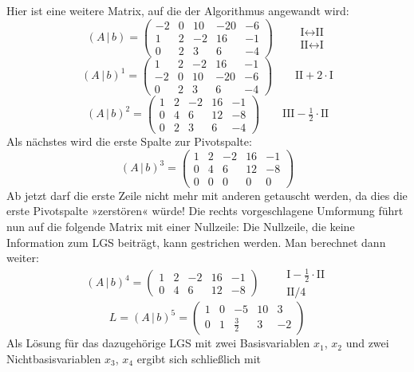 Hier ist eine weitere Matrix, auf die der Algorithmus angewandt wird:
\[ (A\,|\,b) = \left(\begin{array}{cccc|c} -2 & 0 & 10 & -20 & -6\\ 1 & 2 & -2 & 16 & -1\\ 0 & 2 & 3 & 6 & -4 \end{array}\right) \qquad \begin{array}{l} \text{I}\leftrightarrow\text{II}\\ \text{II}\leftrightarrow\text{I} \end{array} \]
\[ (A\,|\,b)^1 = \left(\begin{array}{cccc|c} 1 & 2 & -2 & 16 & -1\\ -2 & 0 & 10 & -20 & -6\\ 0 & 2 & 3 & 6 & -4 \end{array}\right) \qquad \text{II}+2\cdot\text{I} \]
\[ (A\,|\,b)^2 = \left(\begin{array}{cccc|c} 1 & 2 & -2 & 16 & -1\\ 0 & 4 & 6 & 12 & -8\\ 0 & 2 & 3 & 6 & -4 \end{array}\right) \qquad \text{III}-\tfrac{1}{2}\cdot\text{II} \]
Als nächstes wird die erste Spalte zur Pivotspalte:
\[ (A\,|\,b)^3 = \left(\begin{array}{cccc|c} 1 & 2 & -2 & 16 & -1\\ 0 & 4 & 6 & 12 & -8\\ 0 & 0 & 0 & 0 & 0 \end{array}\right) \]
Ab jetzt darf die erste Zeile nicht mehr mit anderen getauscht werden, da dies die erste Pivotspalte »zerstören« würde!
Die rechts vorgeschlagene Umformung führt nun auf die folgende Matrix mit einer Nullzeile:
Die Nullzeile, die keine Information zum LGS beiträgt, kann gestrichen werden. Man berechnet dann weiter:
\[ (A\,|\,b)^4 = \left(\begin{array}{cccc|c} 1 & 2 & -2 & 16 & -1\\ 0 & 4 & 6 & 12 & -8 \end{array}\right) \qquad \begin{array}{l} \text{I}-\tfrac{1}{2}\cdot\text{II}\\ \text{II}/4 \end{array} \]
\[ L = (A\,|\,b)^5 = \left(\begin{array}{cccc|c} 1 & 0 & -5 & 10 & 3\\ 0 & 1 & \frac{3}{2} & 3 & -2 \end{array}\right) \]
Als Lösung für das dazugehörige LGS mit zwei Basisvariablen $x_1$, $x_2$ und zwei Nichtbasisvariablen $x_3$, $x_4$ ergibt sich schließlich mit
